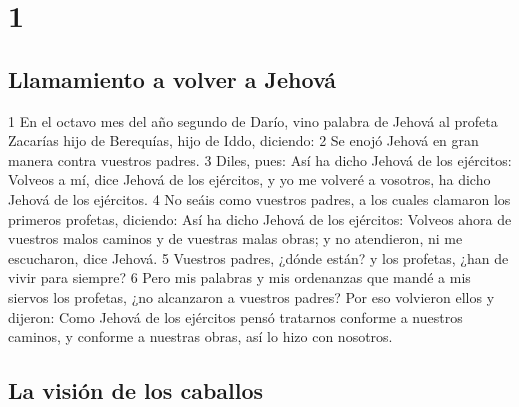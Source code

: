 

\chapter{1}

\section*{Llamamiento a volver a Jehová}

1 En el octavo mes del año segundo de Darío, vino palabra de Jehová al profeta Zacarías hijo de Berequías, hijo de Iddo, diciendo:
2 Se enojó Jehová en gran manera contra vuestros padres.
3 Diles, pues: Así ha dicho Jehová de los ejércitos: Volveos a mí, dice Jehová de los ejércitos, y yo me volveré a vosotros, ha dicho Jehová de los ejércitos.
4 No seáis como vuestros padres, a los cuales clamaron los primeros profetas, diciendo: Así ha dicho Jehová de los ejércitos: Volveos ahora de vuestros malos caminos y de vuestras malas obras; y no atendieron, ni me escucharon, dice Jehová.
5 Vuestros padres, ¿dónde están? y los profetas, ¿han de vivir para siempre?
6 Pero mis palabras y mis ordenanzas que mandé a mis siervos los profetas, ¿no alcanzaron a vuestros padres? Por eso volvieron ellos y dijeron: Como Jehová de los ejércitos pensó tratarnos conforme a nuestros caminos, y conforme a nuestras obras, así lo hizo con nosotros.

\section*{La visión de los caballos}

